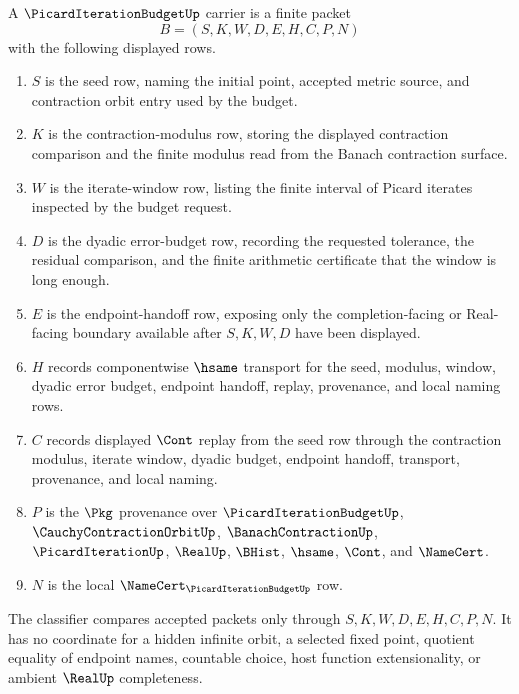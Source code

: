\begin{definition}
\label{def:picard-iteration-budget-carrier}
A $\PicardIterationBudgetUp$ carrier is a finite packet
$$
B=(S,K,W,D,E,H,C,P,N)
$$
with the following displayed rows.
\begin{enumerate}
\item $S$ is the seed row, naming the initial point, accepted metric source, and contraction orbit entry used by the budget.
\item $K$ is the contraction-modulus row, storing the displayed contraction comparison and the finite modulus read from the Banach contraction surface.
\item $W$ is the iterate-window row, listing the finite interval of Picard iterates inspected by the budget request.
\item $D$ is the dyadic error-budget row, recording the requested tolerance, the residual comparison, and the finite arithmetic certificate that the window is long enough.
\item $E$ is the endpoint-handoff row, exposing only the completion-facing or Real-facing boundary available after $S,K,W,D$ have been displayed.
\item $H$ records componentwise $\hsame$ transport for the seed, modulus, window, dyadic error budget, endpoint handoff, replay, provenance, and local naming rows.
\item $C$ records displayed $\Cont$ replay from the seed row through the contraction modulus, iterate window, dyadic budget, endpoint handoff, transport, provenance, and local naming.
\item $P$ is the $\Pkg$ provenance over $\PicardIterationBudgetUp$, $\CauchyContractionOrbitUp$, $\BanachContractionUp$, $\PicardIterationUp$, $\RealUp$, $\BHist$, $\hsame$, $\Cont$, and $\NameCert$.
\item $N$ is the local $\NameCert_{\PicardIterationBudgetUp}$ row.
\end{enumerate}
The classifier compares accepted packets only through $S,K,W,D,E,H,C,P,N$. It has no coordinate for a hidden infinite orbit, a selected fixed point, quotient equality of endpoint names, countable choice, host function extensionality, or ambient $\RealUp$ completeness.
\end{definition}

